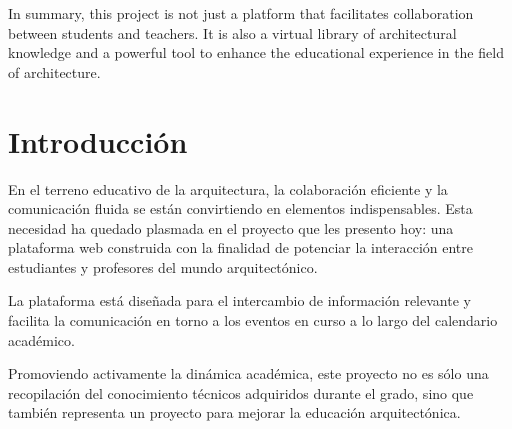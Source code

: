 \documentclass[a4paper, 12pt]{book}
\begin{document}
In summary, this project is not just a platform that facilitates collaboration between students and teachers. It is also a virtual 
library of architectural knowledge and a powerful tool to enhance the educational experience in the field of architecture.



\tableofcontents 
\cleardoublepage
\listoffigures %



\cleardoublepage
\chapter{Introducción}
\label{sec:intro} %

En el terreno educativo de la arquitectura, la colaboración eficiente y la comunicación fluida se están convirtiendo en elementos 
indispensables. Esta necesidad ha quedado plasmada en el proyecto que les presento hoy: una plataforma web construida con la finalidad 
de potenciar la interacción entre estudiantes y profesores del mundo arquitectónico.

La plataforma está diseñada para el intercambio de información relevante y facilita la comunicación en torno a los eventos en curso a 
lo largo del calendario académico.

Promoviendo activamente la dinámica académica, este proyecto no es sólo una recopilación del conocimiento técnicos adquiridos durante 
el grado, sino que también representa un proyecto para mejorar la educación arquitectónica. 
\end{document}
